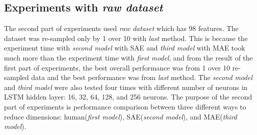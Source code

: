 \documentclass[draft,dvipsnames]{drexel-thesis}
\begin{document}
\begin{thesis}


\section{Experiments with {\em raw dataset}}
The second part of experiments used {\em raw dataset} which has 98 features. The dataset was re-sampled only by 1 over 10 with {\em last} method. This is because the experiment time with {\em second model} with SAE and {\em third model} with MAE took much more than the experiment time with {\em first model}, and from the result of the first part of experiments, the best overall performance was from 1 over 10 re-sampled data and the best performance was from {\em last} method. The {\em second model} and {\em third model} were also tested four times with different number of neurons in LSTM hidden layer: 16, 32, 64, 128, and 256 neurons. The purpose of the second part of experiments is performance comparison between three different ways to reduce dimensions: human({\em first model}), SAE({\em second model}), and MAE({\em third model}). 



\end{thesis}
\end{document}
